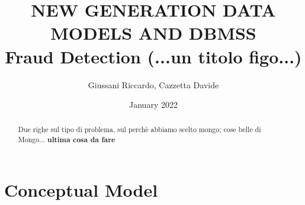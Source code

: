 \documentclass[letterpaper,11pt]{article}
\begin{document}
\title{NEW GENERATION DATA MODELS AND DBMSS \\\textbf{Fraud Detection (...un titolo figo...)}}
\author{Giussani Riccardo, Cazzetta Davide}
\date{January 2022}
\maketitle

\begin{abstract}
Due righe sul tipo di problema, sul perchè abbiamo scelto mongo; cose belle di Mongo... 
\textbf{ultima cosa da fare}
\end{abstract}

\section{Conceptual Model}
\end{document}
